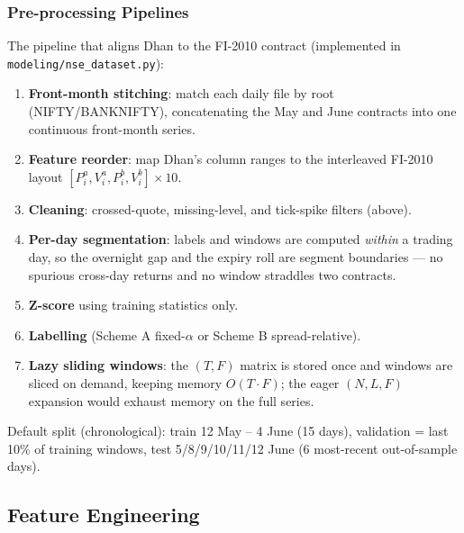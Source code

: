\documentclass[11pt]{article}
\begin{document}
\subsubsection{Pre-processing Pipelines}
The pipeline that aligns Dhan to the FI-2010 contract (implemented in \texttt{modeling/nse\_dataset.py}):
\begin{enumerate}[nosep]
  \item \textbf{Front-month stitching}: match each daily file by root (NIFTY/BANKNIFTY), concatenating the
        May and June contracts into one continuous front-month series.
  \item \textbf{Feature reorder}: map Dhan's column ranges to the interleaved FI-2010 layout
        $[P^a_i,V^a_i,P^b_i,V^b_i]\times 10$.
  \item \textbf{Cleaning}: crossed-quote, missing-level, and tick-spike filters (above).
  \item \textbf{Per-day segmentation}: labels and windows are computed \emph{within} a trading day, so the
        overnight gap and the expiry roll are segment boundaries --- no spurious cross-day returns and no
        window straddles two contracts.
  \item \textbf{Z-score} using training statistics only.
  \item \textbf{Labelling} (Scheme A fixed-$\alpha$ or Scheme B spread-relative).
  \item \textbf{Lazy sliding windows}: the $(T,F)$ matrix is stored once and windows are sliced on demand,
        keeping memory $O(T\cdot F)$; the eager $(N,L,F)$ expansion would exhaust memory on the
        full series.
\end{enumerate}
Default split (chronological): train 12 May -- 4 June (15 days), validation = last 10\% of training
windows, test 5/8/9/10/11/12 June (6 most-recent out-of-sample days).

\subsection{Feature Engineering}
\end{document}
